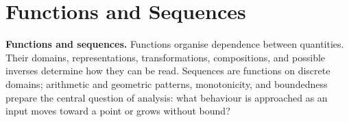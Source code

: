 \chapter{Functions and Sequences}










\noindent\textbf{Functions and sequences.} Functions organise dependence between quantities. Their domains, representations, transformations, compositions, and possible inverses determine how they can be read. Sequences are functions on discrete domains; arithmetic and geometric patterns, monotonicity, and boundedness prepare the central question of analysis: what behaviour is approached as an input moves toward a point or grows without bound?


